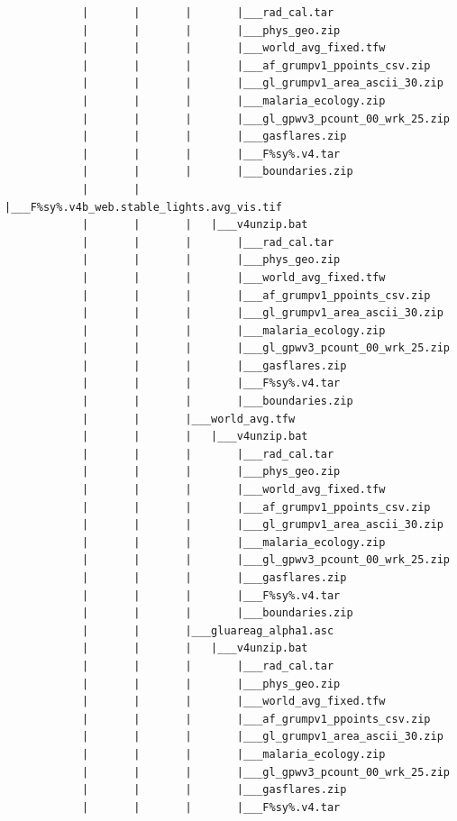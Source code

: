 \documentclass[
]{book}
\begin{document}
\begin{verbatim}
            |       |       |       |___rad_cal.tar
            |       |       |       |___phys_geo.zip
            |       |       |       |___world_avg_fixed.tfw
            |       |       |       |___af_grumpv1_ppoints_csv.zip
            |       |       |       |___gl_grumpv1_area_ascii_30.zip
            |       |       |       |___malaria_ecology.zip
            |       |       |       |___gl_gpwv3_pcount_00_wrk_25.zip
            |       |       |       |___gasflares.zip
            |       |       |       |___F%sy%.v4.tar
            |       |       |       |___boundaries.zip
            |       |       |___F%sy%.v4b_web.stable_lights.avg_vis.tif
            |       |       |   |___v4unzip.bat
            |       |       |       |___rad_cal.tar
            |       |       |       |___phys_geo.zip
            |       |       |       |___world_avg_fixed.tfw
            |       |       |       |___af_grumpv1_ppoints_csv.zip
            |       |       |       |___gl_grumpv1_area_ascii_30.zip
            |       |       |       |___malaria_ecology.zip
            |       |       |       |___gl_gpwv3_pcount_00_wrk_25.zip
            |       |       |       |___gasflares.zip
            |       |       |       |___F%sy%.v4.tar
            |       |       |       |___boundaries.zip
            |       |       |___world_avg.tfw
            |       |       |   |___v4unzip.bat
            |       |       |       |___rad_cal.tar
            |       |       |       |___phys_geo.zip
            |       |       |       |___world_avg_fixed.tfw
            |       |       |       |___af_grumpv1_ppoints_csv.zip
            |       |       |       |___gl_grumpv1_area_ascii_30.zip
            |       |       |       |___malaria_ecology.zip
            |       |       |       |___gl_gpwv3_pcount_00_wrk_25.zip
            |       |       |       |___gasflares.zip
            |       |       |       |___F%sy%.v4.tar
            |       |       |       |___boundaries.zip
            |       |       |___gluareag_alpha1.asc
            |       |       |   |___v4unzip.bat
            |       |       |       |___rad_cal.tar
            |       |       |       |___phys_geo.zip
            |       |       |       |___world_avg_fixed.tfw
            |       |       |       |___af_grumpv1_ppoints_csv.zip
            |       |       |       |___gl_grumpv1_area_ascii_30.zip
            |       |       |       |___malaria_ecology.zip
            |       |       |       |___gl_gpwv3_pcount_00_wrk_25.zip
            |       |       |       |___gasflares.zip
            |       |       |       |___F%sy%.v4.tar

\end{verbatim}
\end{document}
